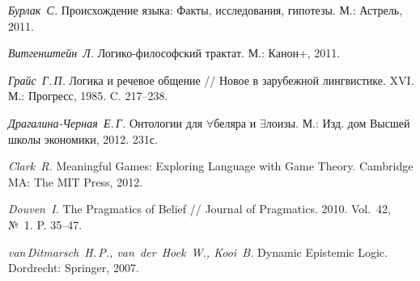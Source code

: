 \newpage

\begin{thebibliography}{00}

\textit{Бурлак~С.} Происхождение языка: Факты, исследования, гипотезы. М.: Астрель, 2011.

\textit{Витгенштейн~Л.} Логико-философский трактат. М.: Канон+, 2011.

\textit{Грайс~Г.\,П.} Логика и речевое общение // Новое в зарубежной лингвистике. XVI. М.: Прогресс, 1985. C. 217–238.

\textit{Драгалина-Черная~Е.\,Г.} Онтологии для $\forall$беляра и $\exists$лоизы. М.: Изд. дом Высшей школы экономики, 2012. 231с.

\textit{Clark~R.} Meaningful Games: Exploring Language with Game Theory. Cambridge MA: The MIT Press, 2012.

\textit{Douven~I.} The Pragmatics of Belief // Journal of Pragmatics. 2010. Vol.~42, №~1. P. 35–47.

\textit{van\,Ditmarsch~H.\,P., van~der~Hoek~W., Kooi~B.} Dynamic Epistemic Logic. Dordrecht: Springer, 2007.


\end{thebibliography}